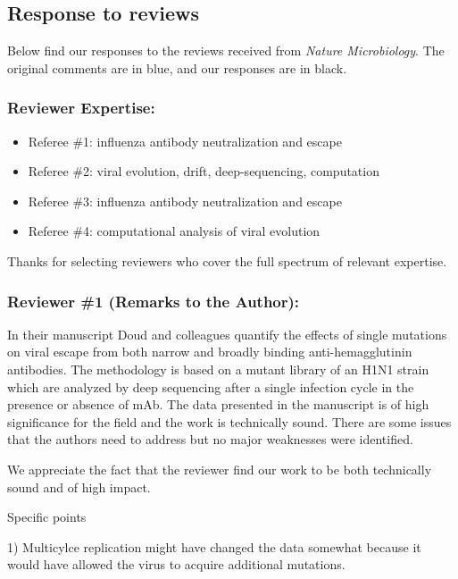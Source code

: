 \documentclass[11pt, oneside]{article}   	%
\begin{document}
\subsection*{Response to reviews}
Below find our responses to the reviews received from \textit{Nature Microbiology}.
The original comments {\color{blue} are in blue}, and our responses are in black.

\color{blue}

\subsubsection*{Reviewer Expertise:}

\begin{itemize}\parskip1pt
\item Referee \#1: influenza antibody neutralization and escape
\item Referee \#2: viral evolution, drift, deep-sequencing, computation
\item Referee \#3: influenza antibody neutralization and escape
\item Referee \#4: computational analysis of viral evolution
\end{itemize}

{\color{black}
Thanks for selecting reviewers who cover the full spectrum of relevant expertise.}

\subsubsection*{Reviewer \#1 (Remarks to the Author):}

In their manuscript Doud and colleagues quantify the effects of single mutations on viral escape from both narrow and broadly binding anti-hemagglutinin antibodies. The methodology is based on a mutant library of an H1N1 strain which are analyzed by deep sequencing after a single infection cycle in the presence or absence of mAb. The data presented in the manuscript is of high significance for the field and the work is technically sound. There are some issues that the authors need to address but no major weaknesses were identified.

{\color{black}
We appreciate the fact that the reviewer find our work to be both technically sound and of high impact.}

Specific points

1) Multicylce replication might have changed the data somewhat because it would have allowed the virus to acquire additional mutations. 
\end{document}
